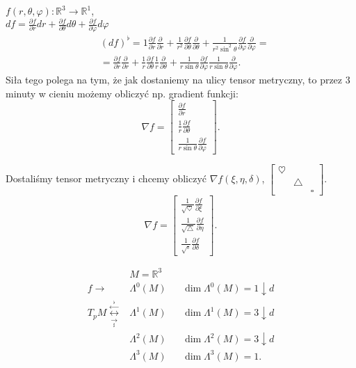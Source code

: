 \documentclass[../main.tex]{subfiles}
\begin{document}
    \begin{przyklad}
        $f(r,\theta,\varphi): \mathbb{R}^3\to \mathbb{R}^1$,\\
        $df = \frac{\partial f}{\partial r}dr + \frac{\partial f}{\partial \theta}d\theta + \frac{\partial f}{\partial \varphi}d\varphi $
        \begin{align*}
            &\left( df \right) ^\flat = 1 \frac{\partial f}{\partial r} \frac{\partial }{\partial r} + \frac{1}{r^2} \frac{\partial f}{\partial \theta} \frac{\partial }{\partial \theta} + \frac{1}{r^2\sin^2\theta}\frac{\partial f}{\partial \varphi} \frac{\partial }{\partial \varphi}=\\
            &= \frac{\partial f}{\partial r} \frac{\partial }{\partial r} + \frac{1}{r} \frac{\partial f}{\partial \theta} \frac{1}{r} \frac{\partial }{\partial \theta} + \frac{1}{r\sin\theta} \frac{\partial f}{\partial \varphi} \frac{1}{r\sin\theta} \frac{\partial }{\partial \varphi}
        .\end{align*}
        Siła tego polega na tym, że jak dostaniemy na ulicy tensor metryczny, to przez 3 minuty w cieniu możemy obliczyć np. gradient funkcji:
        \[
        \nabla f = \begin{bmatrix} \frac{\partial f}{\partial r} \\ \frac{1}{r} \frac{\partial f}{\partial \theta} \\ \frac{1}{r\sin\theta} \frac{\partial f}{\partial \varphi}  \end{bmatrix}
        .\]
    \end{przyklad}
    \begin{przyklad}
        Dostaliśmy tensor metryczny i chcemy obliczyć $\nabla f(\xi, \eta, \delta)$, $\begin{bmatrix} \heartsuit &&\\ &\triangle& \\ &&\square \end{bmatrix} $.
        \[
        \nabla f = \begin{bmatrix} \frac{1}{\sqrt{\heartsuit} } \frac{\partial f}{\partial \xi} \\ \frac{1}{\sqrt{\triangle} } \frac{\partial f}{\partial \eta} \\ \frac{1}{\sqrt{\square} } \frac{\partial f}{\partial \delta} \end{bmatrix}
        .\]
    \end{przyklad}

    \begin{align*}
        &M = \mathbb{R}^3\\
        f\to &\Lambda^0(M) &&\dim \Lambda^0(M) = 1 \downarrow d\\
        T_pM \overset{\overset{\flat}{\leftarrow}}{\underset{\underset{\sharp}{\rightarrow}}{\longleftrightarrow}} &\Lambda^1(M) &&\dim \Lambda^1(M) = 3 \downarrow d\\
        &\Lambda^2(M) &&\dim \Lambda^2(M) = 3 \downarrow d\\
        &\Lambda^3(M) &&\dim \Lambda^3(M) = 1
    .\end{align*}
\end{document}
